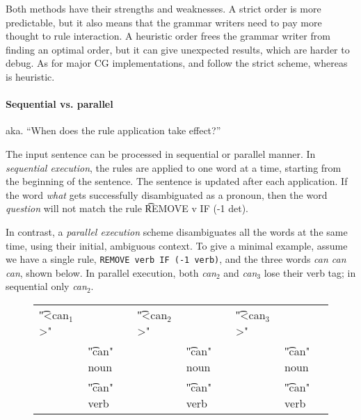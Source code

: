 Both methods have their strengths and weaknesses. A strict order is more predictable, but it also means that the grammar writers need to pay more thought to rule interaction. A heuristic order frees the grammar writer from finding an optimal order, but it can give unexpected results, which are harder to debug.
As for major CG implementations, \cite{karlsson1990cgp} and \cite{vislcg3} follow the strict scheme, whereas \cite{tapanainen1996} is heuristic.


\paragraph{Sequential vs. parallel}

aka. ``When does the rule application take effect?''

The input sentence can be processed in sequential or parallel manner.
In \emph{sequential execution}, the rules are applied to one word at a time, starting from the beginning of the sentence. The sentence is updated after each application. If the word \emph{what} gets successfully disambiguated as a pronoun, then the word \emph{question} will not match the rule \t{REMOVE v IF (-1 det)}.


In contrast, a \emph{parallel execution} scheme disambiguates all the words at the same 
time, using their initial, ambiguous context. 
To give a minimal example, assume we have a single rule, \texttt{REMOVE verb IF (-1 verb)}, and the three words \emph{can can can}, shown below. 
In parallel execution, both \emph{can$_2$} and \emph{can$_3$} lose their verb tag; in sequential only \emph{can$_2$}.


\begin{figure}[h]
\begin{tabular}{p{0.5cm} l   p{0.5cm} l    p{0.5cm} l}
\t{"<can$_1$>"}      &  & \t{"<can$_2$>"}  & & \t{"<can$_3$>"} & \\
   & \t{"can" noun}  &  & \t{"can" noun} & & \t{"can" noun}   \\
   & \t{"can" verb}  &  & \t{"can" verb} & & \t{"can" verb} 

\end{tabular}
\end{figure}

